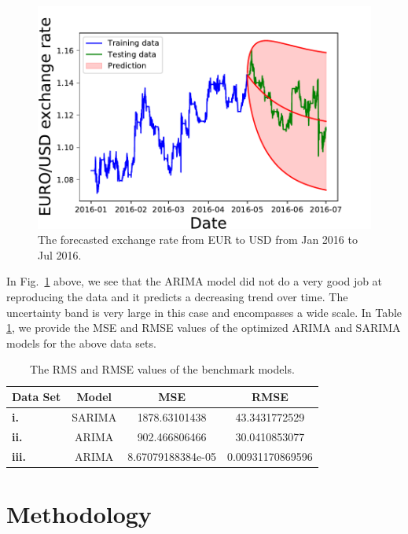 \documentclass[10pt,a4paper]{article}
\begin{document}
\begin{figure}[h]
\begin{center}
\includegraphics[scale=0.4]{EURO_USD_exchange_rate_with_Forecast.pdf}
\caption{The forecasted exchange rate from EUR to USD from Jan 2016 to Jul 2016.}
\label{fig:EURUSD ARIMA forecast}
\centering
\end{center}
\end{figure}

In Fig.~\ref{fig:EURUSD ARIMA forecast} above, we see that the ARIMA model did not do a very good job at reproducing the data and it predicts a decreasing trend over time. The uncertainty band is very large in this case and encompasses a wide scale. In Table \ref{table: RMS values of benchmark models}, we provide the MSE and RMSE values of the optimized ARIMA and SARIMA models for the above data sets.

\begin{table}[h]
\centering
\begin{tabular}{lccc}
Data Set & Model & MSE & RMSE \\ \hline
{\bf i.} & SARIMA & 1878.63101438 & 43.3431772529 \\
{\bf ii.} & ARIMA & 902.466806466 & 30.0410853077 \\
{\bf iii.} & ARIMA & 8.67079188384e-05  &  0.00931170869596 \\ \hline
\end{tabular}
\caption{The RMS and RMSE values of the benchmark models.}
\label{table: RMS values of benchmark models}
\end{table}

%
\section{Methodology}
%
\end{document}
